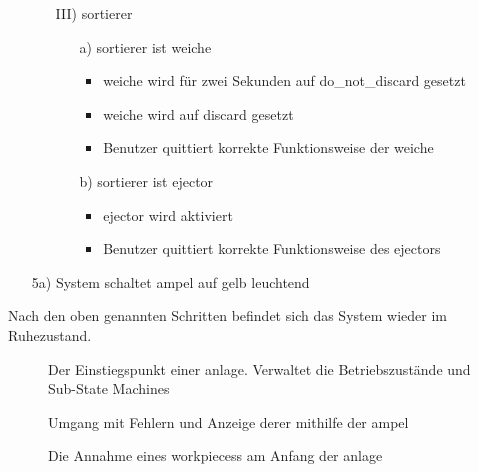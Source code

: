 \begin{enumerate}
\begin{enumerate}
\begin{itemize}
        \end{itemize}
        \item[III)] \Gls{sortierer}
        \begin{enumerate}
            \item[a)] \Gls{sortierer} ist \gls{weiche}
            \begin{itemize}
                \item \gls{weiche} wird für zwei Sekunden auf \gls{do_not_discard} gesetzt
                \item \gls{weiche} wird auf \gls{discard} gesetzt
                \item Benutzer quittiert korrekte Funktionsweise der \gls{weiche}
            \end{itemize}
            \item[b)] \gls{sortierer} ist \gls{ejector}
            \begin{itemize}
                \item \Gls{ejector} wird aktiviert
                \item Benutzer quittiert korrekte Funktionsweise des \gls{ejector}s
            \end{itemize}
        \end{enumerate}
    \end{enumerate}
    \item[5a)] System schaltet \gls{ampel} auf gelb leuchtend
\end{enumerate}
Nach den oben genannten Schritten befindet sich das System wieder im Ruhezustand.


\begin{figure}
    \caption{Der Einstiegspunkt einer \gls{anlage}.
    Verwaltet die Betriebszustände und Sub-State Machines}
    \label{fig:stm_top_level}
\end{figure}

\begin{figure}
    \caption{Umgang mit Fehlern und Anzeige derer mithilfe der \gls{ampel}}
    \label{fig:stm_error}
\end{figure}

\begin{figure}
    \caption{Die Annahme eines \glspl{workpiece}s am Anfang der \gls{anlage}}
    \label{fig:stm_werkstueck_annahme}
\end{figure}

